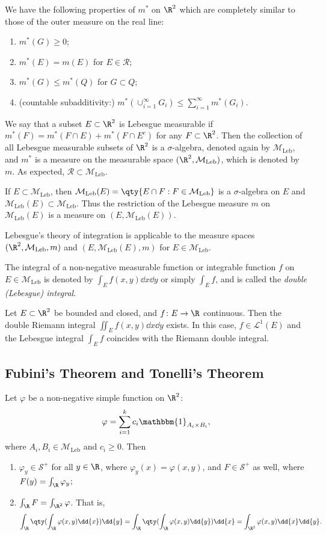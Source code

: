\documentclass{maths}
\newcommand{\mleb}{\mathcal{M}_{\text{Leb}}}
\newcommand{\smpl}{\mathcal{S}}
\newcommand{\ind}{\mathbbm{1}}
\begin{document}
We have the following properties of $m^*$ on $\R^2$ which are completely similar to those of the outer measure on the real line:
\begin{enumerate}
    \item $m^*(G)\geqslant0$;
    \item $m^*(E)=m(E)$ for $E\in\mathcal{R}$;
    \item $m^*(G)\leqslant m^*(Q)$ for $G\subset Q$;
    \item (countable subadditivity:) $m^*(\cup_{i=1}^{\infty} G_i)\leqslant\sum_{i=1}^{\infty}m^*(G_i)$.
\end{enumerate}

We say that a subset $E\subset\R^2$ is Lebesgue measurable if $m^*(F)=m^*(F\cap E)+m^*(F\cap E^c)$ for any $F\subset\R^2$.
Then the collection of all Lebesgue measurable subsets of $\R^2$ is a $\sigma$-algebra, denoted again by $\mleb$, and $m^*$ is a measure on the measurable space $(\R^2,\mleb)$, which is denoted by $m$.
As expected, $\mathcal{R}\subset\mleb$.

If $E\subset\mleb$, then $\mleb(E)=\qty{E\cap F : F\in\mleb}$ is a $\sigma$-algebra on $E$ and $\mleb(E)\subset\mleb$.
Thus the restriction of the Lebesgue measure $m$ on $\mleb(E)$ is a measure on $(E,\mleb(E))$.

Lebesgue's theory of integration is applicable to the measure spaces $(\R^2,\mleb,m)$ and $(E,\mleb(E),m)$ for $E\in\mleb$.

The integral of a non-negative measurable function or integrable function $f$ on $E\in\mleb$ is denoted by $\int_E f(x,y)\dd{x}\dd{y}$ or simply $\int_E f$, and is called the \emph{double (Lebesgue) integral}.

Let $E\subset\R^2$ be bounded and closed, and $f\colon E\to\R$ continuous.
Then the double Riemann integral $\iint_E f(x,y)\dd{x}\dd{y}$ exists.
In this case, $f\in \mathcal{L}^1(E)$ and the Lebesgue integral $\int_E f$ coincides with the Riemann double integral.

\subsection{Fubini's Theorem and Tonelli's Theorem}

\begin{lem}
    Let $\varphi$ be a non-negative simple function on $\R^2$:
    \[
        \varphi =
        \sum_{i=1}^k c_i\ind_{A_i\times B_i},
    \]
    where $A_i,B_i\in\mleb$ and $c_i\geqslant0$.
    Then
    \begin{enumerate}
        \item $\varphi_y\in\smpl^+$ for all $y\in\R$, where $\varphi_y(x)=\varphi(x,y)$, and $F\in\smpl^+$ as well, where $F(y)=\int_\R\varphi_y$;
        \item $\int_\R F = \int_{\R^2}\varphi$.
        That is,
        \[
            \int_\R \qty(\int_\R \varphi(x,y) \dd{x}) \dd{y} =
            \int_\R \qty(\int_\R \varphi(x,y) \dd{y}) \dd{x} =
            \int_{\R^2} \varphi(x,y) \dd{x} \dd{y}.
        \]
    \end{enumerate}
\end{lem}
\end{document}
